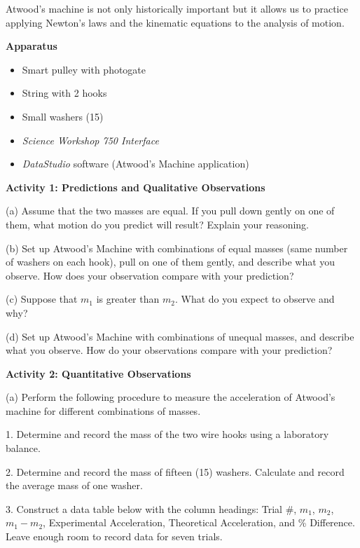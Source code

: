 Atwood's machine is not only historically important but it allows us to practice
applying Newton's laws and the kinematic equations to the analysis of motion.

\textbf{Apparatus} 

\begin{itemize}
\item Smart pulley with photogate 
\item String with 2 hooks 
\item Small washers (15)
\item \textit{Science Workshop 750 Interface}
\item \textit{DataStudio} software (Atwood's Machine application)
\end{itemize}
\textbf{Activity 1: Predictions and Qualitative Observations} 

(a) Assume that the two masses are equal. If you pull down gently on one of
them, what motion do you predict will result? Explain your reasoning.
\vspace{20mm}

(b) Set up Atwood's Machine with combinations of equal masses (same number of
washers on each hook), pull on one of them gently, and describe what you observe.
How does your observation compare with your prediction?
\vspace{20mm}

(c) Suppose that \( m_{1} \) is greater than \( m_{2} \). What do you expect
to observe and why?
\vspace{20mm}

(d) Set up Atwood's Machine with combinations of unequal masses, and describe
what you observe. How do your observations compare with your prediction?
\vspace{20mm}

\textbf{Activity 2: Quantitative Observations }

(a) Perform the following procedure to measure the acceleration of Atwood's
machine for different combinations of masses. 

1. Determine and record the mass of the two wire hooks using a laboratory balance.
\vspace{10mm}

2. Determine and record the mass of fifteen (15) washers. Calculate and record
the average mass of one washer.
\vspace{10mm}

3. Construct a data table below with the column headings: Trial \#, \( m_{1} \),
\( m_{2} \), \( m_{1}  - m_{2} \), Experimental Acceleration, Theoretical
Acceleration, and \% Difference. Leave enough room to record data for seven
trials.
\vspace{50mm}

